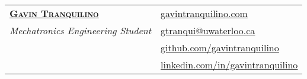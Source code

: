 \documentclass[letterpaper]{article}
\begin{document}
\linespread{1.3}




\begin{center}
    \begin{tabularx}{\textwidth}{@{}X X@{}}
        \textbf{\Huge \scshape \href{https://www.gavintranquilino.com}{Gavin Tranquilino}} &
        \textbf{\hfill} \href{https://www.gavintranquilino.com}{\underline{gavintranquilino.com}}                                                                                                             \\
        \textit{\Large Mechatronics Engineering Student}                                   
        & \textbf{\hfill} \href{mailto:gtranqui@uwaterloo.ca}{\underline{gtranqui@uwaterloo.ca}}                     \\
        & \textbf{\hfill} \href{https://github.com/gavintranquilino}{\underline{github.com/gavintranquilino}} \\
        & \textbf{\hfill} \href{https://linkedin.com/in/gavintranquilino}{\underline{linkedin.com/in/gavintranquilino}} \end{tabularx} \end{center}
\end{document}
